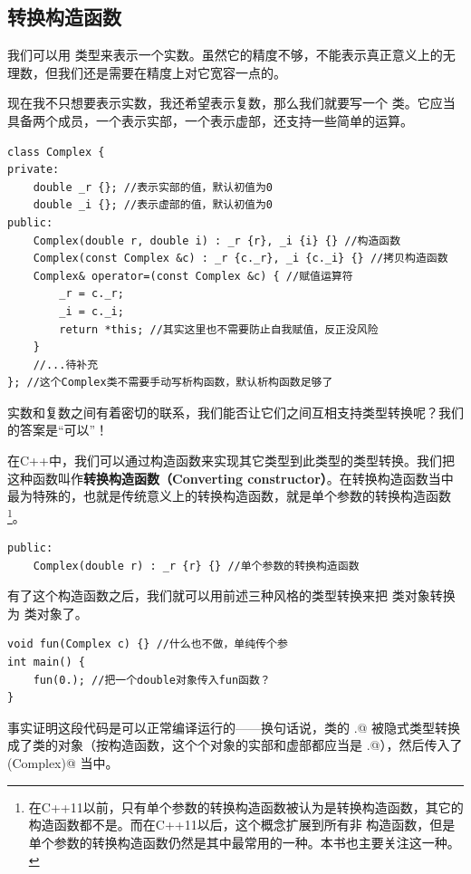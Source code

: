 \subsection*{转换构造函数}
我们可以用 \lstinline@double@ 类型来表示一个实数。虽然它的精度不够，不能表示真正意义上的无理数，但我们还是需要在精度上对它宽容一点的。\par
现在我不只想要表示实数，我还希望表示复数，那么我们就要写一个 \lstinline@Complex@ 类。它应当具备两个成员，一个表示实部，一个表示虚部，还支持一些简单的运算。
\begin{lstlisting}
class Complex {
private:
    double _r {}; //表示实部的值，默认初值为0
    double _i {}; //表示虚部的值，默认初值为0
public:
    Complex(double r, double i) : _r {r}, _i {i} {} //构造函数
    Complex(const Complex &c) : _r {c._r}, _i {c._i} {} //拷贝构造函数
    Complex& operator=(const Complex &c) { //赋值运算符
        _r = c._r;
        _i = c._i;
        return *this; //其实这里也不需要防止自我赋值，反正没风险
    }
    //...待补充
}; //这个Complex类不需要手动写析构函数，默认析构函数足够了
\end{lstlisting}
实数和复数之间有着密切的联系，我们能否让它们之间互相支持类型转换呢？我们的答案是``可以''！\par
在C++中，我们可以通过构造函数来实现其它类型到此类型的类型转换。我们把这种函数叫作\textbf{转换构造函数（Converting constructor）}。在转换构造函数当中最为特殊的，也就是传统意义上的转换构造函数，就是单个参数的转换构造函数\footnote{在C++11以前，只有单个参数的转换构造函数被认为是转换构造函数，其它的构造函数都不是。而在C++11以后，这个概念扩展到所有非 \lstinline@explicit@ 构造函数，但是单个参数的转换构造函数仍然是其中最常用的一种。本书也主要关注这一种。}。
\begin{lstlisting}
public:
    Complex(double r) : _r {r} {} //单个参数的转换构造函数
\end{lstlisting}
有了这个构造函数之后，我们就可以用前述三种风格的类型转换来把 \lstinline@double@ 类对象转换为 \lstinline@Complex@ 类对象了。\par
\begin{lstlisting}
void fun(Complex c) {} //什么也不做，单纯传个参
int main() {
    fun(0.); //把一个double对象传入fun函数？
}
\end{lstlisting}
事实证明这段代码是可以正常编译运行的——换句话说，\lstinline@double@ 类的 .@ 被隐式类型转换成了\linebreak\lstinline@Complex@ 类的对象（按构造函数，这个个对象的实部和虚部都应当是 .@），然后传入了 \lstinline@fun(Complex)@ 当中。\par
